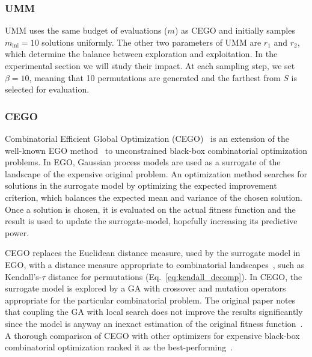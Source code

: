 \documentclass[sigconf,dvipsnames]{acmart}
\newcommand{\minit}{\ensuremath{m_\text{ini}}\xspace}
\newcommand{\FEmax}{\ensuremath{m}}
\begin{document}
\subsubsection{UMM}
%
UMM uses the same budget of evaluations ($\FEmax$) as CEGO
and initially samples $\minit=10$ solutions uniformly. The other two parameters
of UMM are $r_1$ and $r_2$, which determine the balance between exploration and
exploitation. In the experimental section we will study their impact. %
At each sampling step, we set $\beta=10$, meaning that 10 permutations are generated and the farthest from $S$ is selected for evaluation. 

\subsubsection{CEGO} 
Combinatorial Efficient Global Optimization (CEGO)~\citep{ZaeStoFriFisNauBar2014} is an extension of the well-known EGO
method~\citep{JonSchWel98go} to unconstrained black-box combinatorial
optimization problems. In EGO, Gaussian process models are used as a surrogate
of the landscape of the expensive original problem. An optimization method
searches for solutions in the surrogate model by optimizing the expected
improvement criterion, which balances the expected mean and variance of the
chosen solution. Once a solution is chosen, it is evaluated on the actual
fitness function and the result is used to update the surrogate-model,
hopefully increasing its predictive power.

CEGO replaces the Euclidean distance measure, used by the surrogate model in
EGO, with a distance measure appropriate to combinatorial
landscapes~\citep{ZaeStoBar2014:ppsn}, such as Kendall's-$\tau$ distance for
permutations (Eq.~\ref{eq:kendall_decomp}). In CEGO, the surrogate model is
explored by a GA with crossover and mutation operators appropriate for the
particular combinatorial problem. The original paper notes that coupling the GA
with local search does not improve the results significantly since the model is
anyway an inexact estimation of the original fitness
function~\citep[p.~875]{ZaeStoFriFisNauBar2014}. A thorough comparison of CEGO
with other optimizers for expensive black-box combinatorial optimization ranked
it as the best-performing~\citep{ZaeStoFriFisNauBar2014}.
\end{document}
